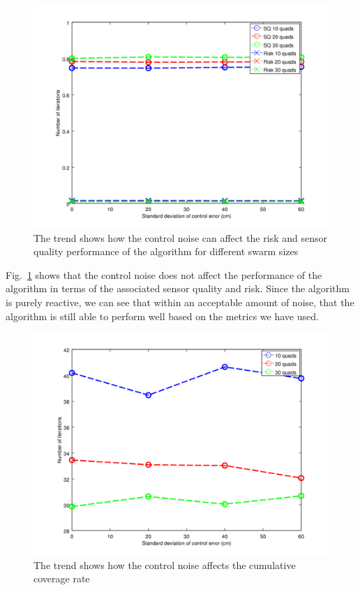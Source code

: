 \documentclass{article}
\begin{document}
\begin{figure}[h!]

    \includegraphics[width=1\columnwidth]{tasefigs/cn_sq_risk.png}

    \caption{The trend shows how the control noise can affect the risk and
        sensor quality performance of the algorithm for different swarm sizes}

    \label{fig:res_cn_r_sq}

\end{figure}

Fig.~\ref{fig:res_cn_r_sq} shows that the control noise does not affect the
performance of the algorithm in terms of the associated sensor quality and
risk. Since the algorithm is purely reactive, we can see that within an
acceptable amount of noise, that the algorithm is still able to perform well
based on the metrics we have used.

\begin{figure}

    \includegraphics[width=1\columnwidth]{tasefigs/perf_cn.png}

    \caption{The trend shows how the control noise affects the cumulative
    coverage rate}

    \label{fig:res_perf_cn}

\end{figure}
\end{document}
